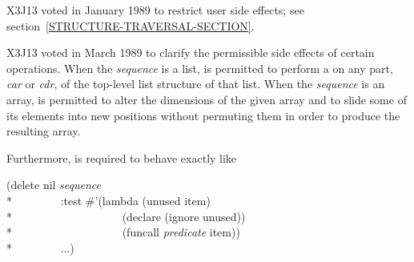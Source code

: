 \begin{defun}[Function]
\begin{new}
X3J13 voted in January 1989
to restrict user side effects; see section~\ref{STRUCTURE-TRAVERSAL-SECTION}.
\end{new}

\begin{newer}
X3J13 voted in March 1989 
to clarify the permissible side effects of certain operations.
When the \emph{sequence} is a list,
 is permitted to perform a  on any part,
\emph{car} or \emph{cdr}, of the top-level list structure of that list.
When the \emph{sequence} is an array,
 is permitted to alter the dimensions of the given array
and to slide some of its elements into new positions without permuting them
in order to produce the resulting array.

Furthermore, 
is required to behave exactly like
\begin{lisp}
(delete nil \emph{sequence} \\*
~~~~~~~~:test \#'(lambda (unused item) \\*
~~~~~~~~~~~~~~~~~~~(declare (ignore unused)) \\*
~~~~~~~~~~~~~~~~~~~(funcall \emph{predicate} item)) \\*
~~~~~~~~...)
\end{lisp}
\end{newer}
\end{defun}

